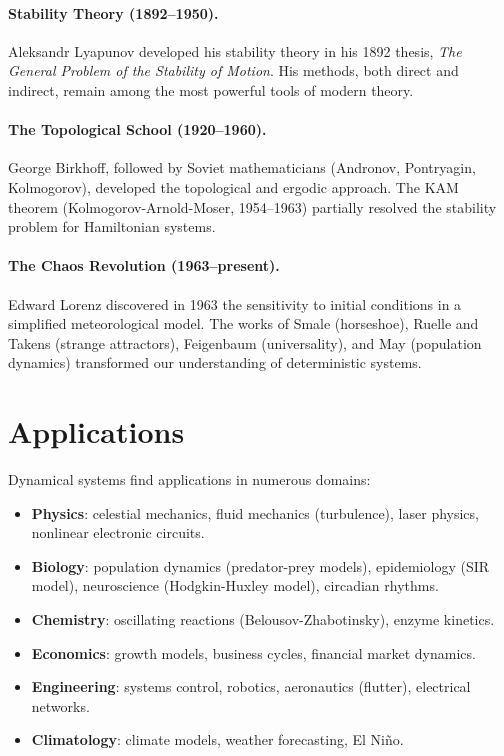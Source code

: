 \paragraph{Stability Theory (1892--1950).}
Aleksandr Lyapunov developed his stability theory in his 1892 thesis,
\emph{The General Problem of the Stability of Motion}. His methods, both
direct and indirect, remain among the most powerful tools of modern theory.

\paragraph{The Topological School (1920--1960).}
George Birkhoff, followed by Soviet mathematicians (Andronov, Pontryagin,
Kolmogorov), developed the topological and ergodic approach. The KAM theorem
(Kolmogorov-Arnold-Moser, 1954--1963) partially resolved the stability
problem for Hamiltonian systems.

\paragraph{The Chaos Revolution (1963--present).}
Edward Lorenz discovered in 1963 the sensitivity to initial conditions in a
simplified meteorological model. The works of Smale (horseshoe), Ruelle and
Takens (strange attractors), Feigenbaum (universality), and May (population
dynamics) transformed our understanding of deterministic systems.

\section*{Applications}

Dynamical systems find applications in numerous domains:

\begin{itemize}
    \item \textbf{Physics}: celestial mechanics, fluid mechanics (turbulence),
    laser physics, nonlinear electronic circuits.

    \item \textbf{Biology}: population dynamics (predator-prey models),
    epidemiology (SIR model), neuroscience (Hodgkin-Huxley model),
    circadian rhythms.

    \item \textbf{Chemistry}: oscillating reactions (Belousov-Zhabotinsky),
    enzyme kinetics.

    \item \textbf{Economics}: growth models, business cycles, financial
    market dynamics.

    \item \textbf{Engineering}: systems control, robotics, aeronautics
    (flutter), electrical networks.

    \item \textbf{Climatology}: climate models, weather forecasting, El Ni\~no.
\end{itemize}

